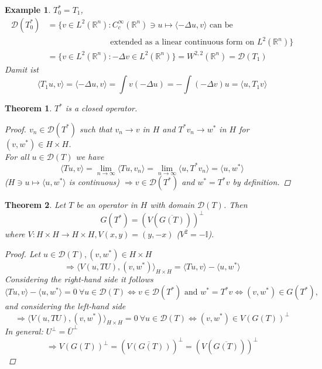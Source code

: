 \documentclass[12pt]{extreport} %
\newcommand{\R}{\mathbb{R}}
\newcommand{\DO}[1]{\mathcal{D}\left( {#1} \right)}
\theoremstyle{named}
\theoremstyle{nnamed}
\theoremstyle{itshape}
\newtheorem{theorem}{Theorem}  \counterwithin{theorem}{chapter}
\theoremstyle{normal}
\newtheorem*{example}{Example}
\begin{document}
\begin{example}
	$T_0^* = T_1$, 
	\begin{align*}
		\DO{T_0^*} & = \big\{ v \in L^2(\R^n) \colon C_c^\infty(\R^n) \ni u \mapsto \langle - \Delta u, v \rangle \text{ can be } \\
			& ~\hspace{3cm} \text{ extended as a linear continuous form on } L^2(\R^n) \big\} \\
			& = \big\{ v \in L^2(\R^n) \colon - \Delta v \in L^2(\R^n) \big\} = W^{2,2}(\R^n) = \DO{T_1}
	\end{align*}
	Damit ist
	$$ \langle T_1 u, v \rangle = \langle - \Delta u, v \rangle = \int v \left( - \Delta u \right) = - \int \left( - \Delta v \right) u = \langle u, T_1 v \rangle $$
\end{example}

\begin{theorem} \label{I.1:thm}
	$T^*$ is a closed operator.
	
	\begin{proof}
		$v_n \in \DO{T^*}$ such that $v_n \rightarrow v$ in $H$ and $T^* v_n \rightarrow w^*$ in $H$ for $(v, w^*) \in H \times H$. ~\\
		For all $u \in \DO{T}$ we have
			$$ \langle Tu, v \rangle = \lim_{n \rightarrow \infty} \langle T u, v_n \rangle = \lim_{n \rightarrow \infty} \langle u, T^* v_n \rangle = \langle u , w^* \rangle $$
		($H \ni u \mapsto \langle u, w^* \rangle$ is continuous) $\Rightarrow v \in \DO{T^*}$ and $w^* = T^* v$ by definition.
	\end{proof}
\end{theorem}

\begin{theorem} \label{I.2:thm}
	Let $T$ be an operator in $H$ with domain $\DO{T}$. Then
		$$ G \left( T^* \right) = \left( V \left( \overline{G(T)} \right) \right)^{\perp} $$
	where $V \colon H \times H \rightarrow H \times H, V(x, y) = (y, -x)$ ($V^2 = - \mathbb{I}$).
	
	\begin{proof}
		Let $u \in \DO{T}, \left(v, w^* \right) \in H \times H$ 
			$$ \Rightarrow \langle V \left( u, TU \right), \left( v, w^* \right) \rangle_{H \times H} = \langle T u, v \rangle - \langle u, w^* \rangle $$
		Considering the right-hand side it follows
		$$ \langle T u, v \rangle - \langle u, w^* \rangle = 0 ~ \forall u \in \DO{T} \iff v \in \DO{T^*} \text{ and } w^* = T^* v \iff \left( v, w^* \right) \in G\left( T^* \right), $$
		and considering the left-hand side
		$$ \Rightarrow \langle V \left( u, TU \right), \left( v, w^* \right) \rangle_{H \times H} = 0 ~ \forall u \in \DO{T} \iff \left( v, w^* \right) \in V \left( G(T) \right)^{\perp} $$
		In general: $U^{\perp} = \overline{U}^{\perp}$
		$$ \Rightarrow V \left( G(T) \right)^{\perp} = \left( \overline{V\left( G(T) \right)} \right)^{\perp} = \left( V \left( \overline{G(T)} \right) \right)^{\perp} $$
	\end{proof}
\end{theorem}
\end{document}
